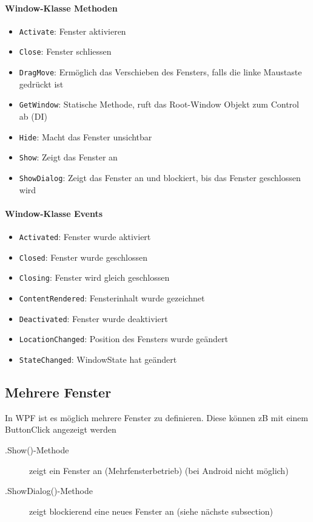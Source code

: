 \paragraph{Window-Klasse Methoden}
\begin{itemize}
\item \verb+Activate+: Fenster aktivieren
\item \verb+Close+: Fenster schliessen
\item \verb+DragMove+: Ermöglich das Verschieben des Fensters, falls die linke Maustaste gedrückt ist
\item \verb+GetWindow+: Statische Methode, ruft das Root-Window Objekt zum Control ab (DI)
\item \verb+Hide+: Macht das Fenster unsichtbar
\item \verb+Show+: Zeigt das Fenster an
\item \verb+ShowDialog+: Zeigt das Fenster an und blockiert, bis das Fenster geschlossen wird
\end{itemize}
\paragraph{Window-Klasse Events}
\begin{itemize}
\item \verb+Activated+: Fenster wurde aktiviert
\item \verb+Closed+: Fenster wurde geschlossen
\item \verb+Closing+: Fenster wird gleich geschlossen
\item \verb+ContentRendered+: Fensterinhalt wurde gezeichnet
\item \verb+Deactivated+: Fenster wurde deaktiviert
\item \verb+LocationChanged+: Position des Fensters wurde geändert
\item \verb+StateChanged+: WindowState hat geändert
\end{itemize}
\subsection{Mehrere Fenster}
In WPF ist es möglich mehrere Fenster zu definieren. Diese können zB mit einem ButtonClick angezeigt werden
\begin{description}
\item[.Show()-Methode] zeigt ein Fenster an (Mehrfensterbetrieb) (bei Android nicht möglich)
\item[.ShowDialog()-Methode] zeigt blockierend eine neues Fenster an (siehe nächste subsection)
\end{description}

